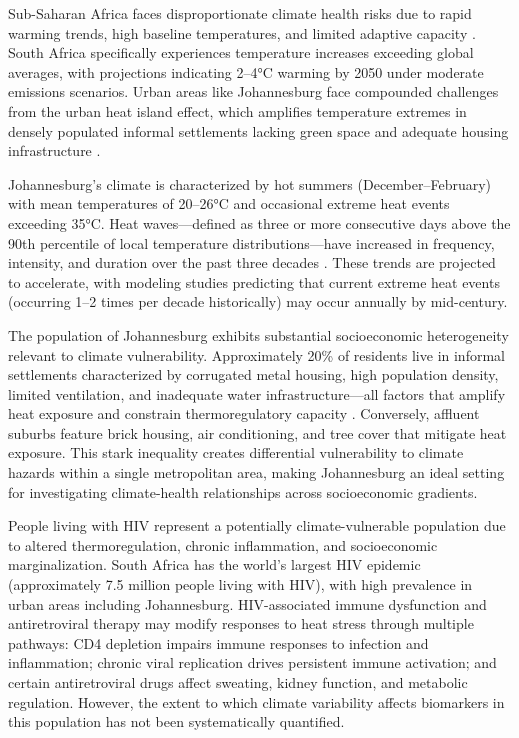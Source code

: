 Sub-Saharan Africa faces disproportionate climate health risks due to rapid warming trends, high baseline temperatures, and limited adaptive capacity \citep{wright2021climate}. South Africa specifically experiences temperature increases exceeding global averages, with projections indicating 2--4°C warming by 2050 under moderate emissions scenarios. Urban areas like Johannesburg face compounded challenges from the urban heat island effect, which amplifies temperature extremes in densely populated informal settlements lacking green space and adequate housing infrastructure \citep{gcro2019heatvuln}.

Johannesburg's climate is characterized by hot summers (December--February) with mean temperatures of 20--26°C and occasional extreme heat events exceeding 35°C. Heat waves---defined as three or more consecutive days above the 90th percentile of local temperature distributions---have increased in frequency, intensity, and duration over the past three decades \citep{wright2021climate}. These trends are projected to accelerate, with modeling studies predicting that current extreme heat events (occurring 1--2 times per decade historically) may occur annually by mid-century.

The population of Johannesburg exhibits substantial socioeconomic heterogeneity relevant to climate vulnerability. Approximately 20\% of residents live in informal settlements characterized by corrugated metal housing, high population density, limited ventilation, and inadequate water infrastructure---all factors that amplify heat exposure and constrain thermoregulatory capacity \citep{gcro2019heatvuln}. Conversely, affluent suburbs feature brick housing, air conditioning, and tree cover that mitigate heat exposure. This stark inequality creates differential vulnerability to climate hazards within a single metropolitan area, making Johannesburg an ideal setting for investigating climate-health relationships across socioeconomic gradients.

People living with HIV represent a potentially climate-vulnerable population due to altered thermoregulation, chronic inflammation, and socioeconomic marginalization. South Africa has the world's largest HIV epidemic (approximately 7.5 million people living with HIV), with high prevalence in urban areas including Johannesburg. HIV-associated immune dysfunction and antiretroviral therapy may modify responses to heat stress through multiple pathways: CD4 depletion impairs immune responses to infection and inflammation; chronic viral replication drives persistent immune activation; and certain antiretroviral drugs affect sweating, kidney function, and metabolic regulation. However, the extent to which climate variability affects biomarkers in this population has not been systematically quantified.

